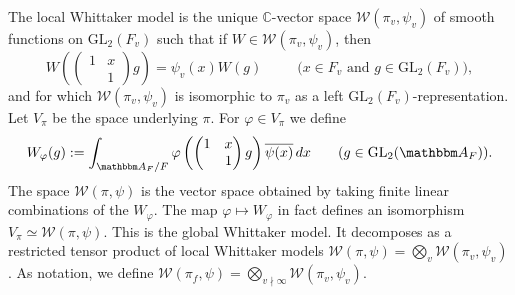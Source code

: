 \documentclass[10pt, twoside]{amsart}
\theoremstyle{plain}
\theoremstyle{definition}
\theoremstyle{remark}
\numberwithin{equation}{subsection}
\def\C{\mathbb C}
\def\A{\mathbbm A}
\def\GL{\mathrm{GL}}
\def\calw{\mathcal W}
\begin{document}
The local Whittaker model is the unique $\C$-vector space $\calw (\pi_v, \psi_v)$ of smooth functions on $\GL_2 (F_v)$ such that if $W \in \calw (\pi_v, \psi_v)$, then
$$
W\left( \begin{pmatrix} 1 & x \\ & 1 \end{pmatrix} g\right) = \psi_v (x) W(g) \;\;\;\;\;\;\;\;\; {\text{($x \in F_v$ and $g \in \GL_2(F_v)$)},}
$$
and for which $\calw (\pi_v, \psi_v)$ is isomorphic to $\pi_v$ as a left $\GL_2(F_v)$-representation. Let $V_{\pi}$ be the space underlying $\pi$. For $\varphi \in V_{\pi}$ we define
\begin{equation}\label{eqn:assoc-whit-fns}
W_\varphi (g) := \int_{\A_F /F}  \varphi \left(  \begin{pmatrix} 1 & x \\ & 1 \end{pmatrix} g\right) \overline{\psi (x)}\,dx \;\;\;\;\;\;\; (g \in \GL_2(\A_F)).
\end{equation}
The space $\calw (\pi, \psi)$ is the vector space obtained by taking finite linear combinations of the $W_{\varphi}$. The map $\varphi \mapsto W_{\varphi}$ in fact defines an isomorphism $V_{\pi} \simeq \calw(\pi,\psi)$. This is the global Whittaker model. It decomposes as a restricted tensor product of local Whittaker models $\calw(\pi, \psi) = \bigotimes_v \calw (\pi_v, \psi_v)$. As notation, we define $\calw (\pi_f,\psi) = \bigotimes_{v \nmid \infty} \calw (\pi_v,\psi_v)$.
\end{document}
